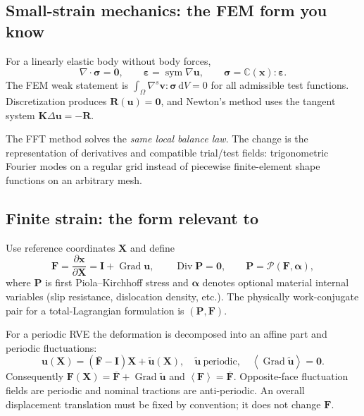 \documentclass[11pt,a4paper]{article}
\newcommand{\avg}[1]{\left\langle #1\right\rangle}
\newcommand{\dd}{\mathrm{d}}
\newcommand{\Grad}{\operatorname{Grad}}
\newcommand{\Div}{\operatorname{Div}}
\newcommand{\sym}{\operatorname{sym}}
\newcommand{\mb}[1]{\boldsymbol{#1}}
\newcommand{\code}[1]{\texttt{\detokenize{#1}}}
\begin{document}
\subsection{Small-strain mechanics: the FEM form you know}
For a linearly elastic body without body forces,
\begin{equation}
\nabla\cdot\mb\sigma=\mathbf 0,\qquad
\mb\varepsilon=\sym\nabla\mathbf u,\qquad
\mb\sigma=\mathbb C(\mathbf x):\mb\varepsilon.
\end{equation}
The FEM weak statement is $\int_\Omega\nabla^s\mathbf v:\mb\sigma\,\dd V=0$ for all admissible test functions. Discretization produces $\mathbf R(\mathbf u)=\mathbf0$, and Newton's method uses the tangent system $\mathbf K\Delta\mathbf u=-\mathbf R$.

The FFT method solves the \emph{same local balance law}. The change is the representation of derivatives and compatible trial/test fields: trigonometric Fourier modes on a regular grid instead of piecewise finite-element shape functions on an arbitrary mesh.

\subsection{Finite strain: the form relevant to \code{FFTMechanics}}
Use reference coordinates $\mathbf X$ and define
\begin{equation}
\mathbf F=\frac{\partial\mathbf x}{\partial\mathbf X}=\mathbf I+\Grad\mathbf u,
\qquad \Div\mathbf P=\mathbf0,
\qquad \mathbf P=\mathcal P(\mathbf F,\mb\alpha),
\label{eq:finitebalance}
\end{equation}
where $\mathbf P$ is first Piola--Kirchhoff stress and $\mb\alpha$ denotes optional material internal variables (slip resistance, dislocation density, etc.). The physically work-conjugate pair for a total-Lagrangian formulation is $(\mathbf P,\mathbf F)$.

For a periodic RVE the deformation is decomposed into an affine part and periodic fluctuations:
\begin{equation}
\mathbf u(\mathbf X)= (\overline{\mathbf F}-\mathbf I)\mathbf X+\widetilde{\mathbf u}(\mathbf X),
\quad \widetilde{\mathbf u}\ \text{periodic},\quad
\avg{\Grad\widetilde{\mathbf u}}=\mathbf0.
\label{eq:split}
\end{equation}
Consequently $\mathbf F(\mathbf X)=\overline{\mathbf F}+\Grad\widetilde{\mathbf u}$ and $\avg{\mathbf F}=\overline{\mathbf F}$. Opposite-face fluctuation fields are periodic and nominal tractions are anti-periodic. An overall displacement translation must be fixed by convention; it does not change $\mathbf F$.
\end{document}
